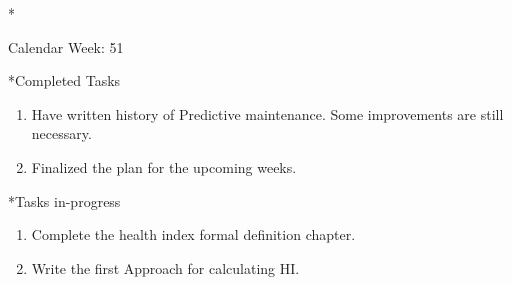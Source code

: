 \documentclass[11pt,a4paper]{article}
\begin{document}
\newpage
\begin{section}*{Calendar Week: 51 \hfill \date{18 December, 2020}}
 \begin{refsection}

       \begin{subsection}*{Completed Tasks}
             \begin{enumerate}
                   \item
                         Have written history of Predictive maintenance. Some improvements are still necessary.
                   \item
                         Finalized the plan for the upcoming weeks.
             \end{enumerate}
       \end{subsection}


       \begin{subsection}*{Tasks in-progress}
             \begin{enumerate}
                   \item
                         Complete the health index formal definition chapter.
                   \item
                         Write the first Approach for calculating HI.
             \end{enumerate}
       \end{subsection}

 \end{refsection}
\end{section}
\end{document}
